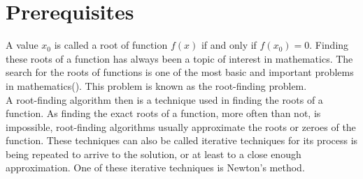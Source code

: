 




\section{Prerequisites}

A value $x_0$ is called a root of function $f(x)$ if and only if  $f(x_0) = 0$. Finding these roots of a function has always been a topic of interest in mathematics. The search for the roots of functions is one of the most basic and important problems in mathematics(\cite{numAnal}). This problem is known as the root-finding problem.
\\


A root-finding algorithm then is a technique used in finding the roots of a function. As finding the exact roots of a function, more often than not, is impossible, root-finding algorithms usually approximate the roots or zeroes of the function. These techniques can also be called iterative techniques for its process is being repeated to arrive to the solution, or at least to a close enough approximation. One of these iterative techniques is Newton's method.
\\


